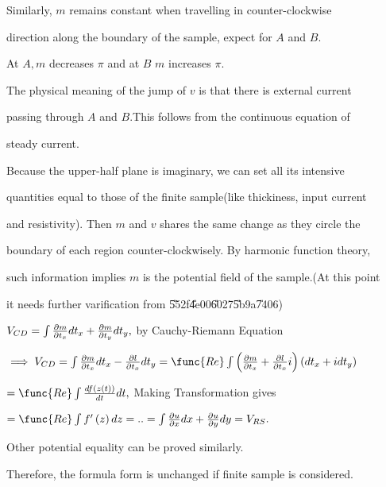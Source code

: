 \documentclass{article}
\begin{document}
Similarly, $m$ remains constant when travelling in counter-clockwise

direction along the boundary of the sample, expect for $A$ and $B.$

At $A,m$ decreases $\pi $ and at $B$ $m$ increases $\pi .$

The physical meaning of the jump of $v$ is that there is external current

passing through $A$ and $B.$This follows from the continuous equation of 

steady current.

Because the upper-half plane is imaginary, we can set all its intensive 

quantities equal to those of the finite sample(like thickiness, input current

and resistivity). Then $m$ and $v$ shares the same change as they circle the 

boundary of each region counter-clockwisely. By harmonic function theory,

such information implies $m$ is the potential field of the sample.(At this
point

it needs further varification from \U{552f}\U{4e00}\U{6027}\U{5b9a}\U{7406})

$V_{CD}=\int \frac{\partial m}{\partial t_{x}}dt_{x}+\frac{\partial m}{%
\partial t_{y}}dt_{y},$ by Cauchy-Riemann Equation

$\implies V_{CD}=\int \frac{\partial m}{\partial t_{x}}dt_{x}-\frac{\partial
l}{\partial t_{x}}dt_{y}=\func{Re}\int \left( \frac{\partial m}{\partial
t_{x}}+\frac{\partial l}{\partial t_{x}}i\right) \left(
dt_{x}+idt_{y}\right) $

$=\func{Re}\int \frac{df\left( z\left( t\right) \right) }{dt}dt,$ Making
Transformation gives

$=\func{Re}\int f^{\prime }\left( z\right) dz=..=\int \frac{\partial u}{%
\partial x}dx+\frac{\partial u}{\partial y}dy=V_{RS}.$

Other potential equality can be proved similarly.

Therefore, the formula form is unchanged if finite sample is considered.
\end{document}

